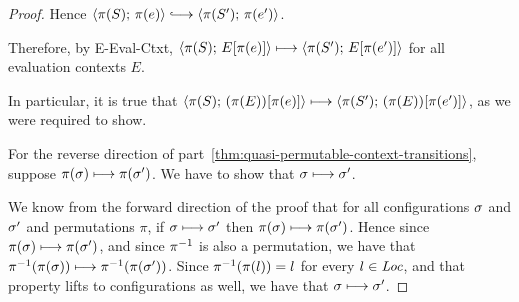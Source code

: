 \begin{proof}
  Hence $\config{\pi(S)}{\pi(e)} \parstepsto
  \config{\pi(S')}{\pi(e')}$.

  Therefore, by {\sc E-Eval-Ctxt}, $\langle \pi(S);\, E\hspace{-0.5mm}\left[\pi(e)\right] \rangle
  \longmapsto \langle \pi(S');\, E\hspace{-0.5mm}\left[\pi(e')\right] \rangle$ for all evaluation
  contexts $E$.

  In particular, it is true that
  $\langle \pi(S);\, (\pi(E))\hspace{-0.5mm}\left[\pi(e)\right] \rangle \longmapsto
  \langle \pi(S');\, (\pi(E))\hspace{-0.5mm}\left[\pi(e')\right] \rangle$, as we were required
  to show.

  For the reverse direction of
  part~\ref{thm:quasi-permutable-context-transitions}, suppose
  $\pi(\sigma) \longmapsto \pi(\sigma')$.  We have to show that $\sigma
  \longmapsto \sigma'$.

  We know from the forward direction of the proof that for all
  configurations $\sigma$ and $\sigma'$ and permutations $\pi$, if
  $\sigma \longmapsto \sigma'$ then $\pi(\sigma) \longmapsto
  \pi(\sigma')$.  Hence since $\pi(\sigma) \longmapsto \pi(\sigma')$, and
  since $\pi^{-1}$ is also a permutation, we have that
  $\pi^{-1}(\pi(\sigma)) \longmapsto \pi^{-1}(\pi(\sigma'))$.  Since
  $\pi^{-1}(\pi(l)) = l$ for every $l \in \mathit{Loc}$, and that property lifts
  to configurations as well, we have that $\sigma \longmapsto \sigma'$.

\end{proof}
